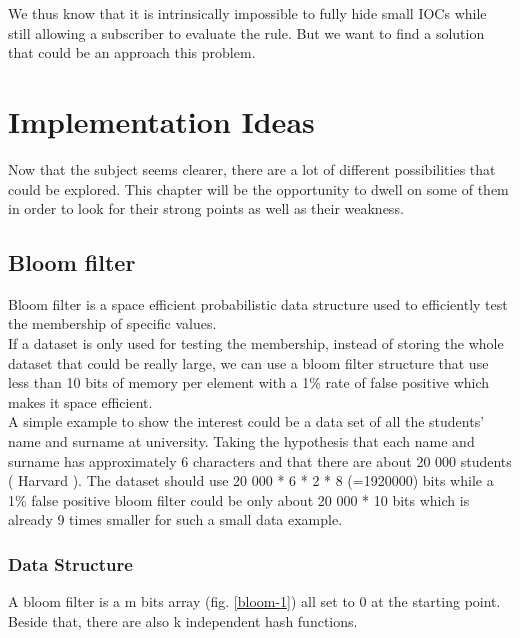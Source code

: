 \documentclass{eplmastersthesis}
\begin{document}
We thus know that it is intrinsically impossible to fully hide small IOCs while still allowing a subscriber to evaluate the rule. But we want to find a solution that could be an approach this problem.


\chapter{Implementation Ideas}

Now that the subject seems clearer, there are a lot of different possibilities that could be explored. This chapter will be the opportunity to dwell on some of them in order to look for their strong points as well as their weakness.

\section{Bloom filter}
Bloom filter is a space efficient probabilistic data structure  used to efficiently test the membership of specific values.\\
If a dataset is only used for testing the membership, instead of storing the whole dataset that could be really large, we can use a bloom filter structure that use less than 10 bits of memory per element with a 1\% rate of false positive which makes it space efficient.\\
A simple example to show the interest could be a data set of all the students' name and surname at university. Taking the hypothesis that each name and surname has approximately 6 characters and that there are about 20 000 students ( Harvard ). The dataset should use 20 000 * 6 * 2 * 8 (=1920000) bits while a 1\% false positive bloom filter could be only about 20 000 * 10 bits which is already 9 times smaller for such a small data example.\\

\subsection{Data Structure}
A bloom filter is a m bits array (fig. \ref{bloom-1}) all set to 0 at the starting point. Beside that, there are also k independent hash functions. 
\end{document}
